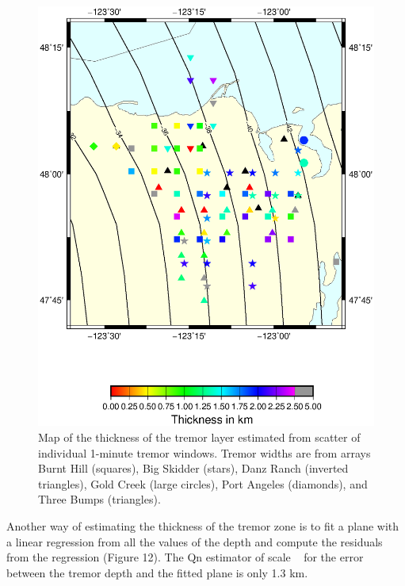 \documentclass[draft]{agujournal2019}
\begin{document}
\begin{figure}
\noindent\includegraphics[width=\textwidth, trim={1cm 5cm 3.5cm 4cm},clip]{figures/Q_PWS_PWS.eps}
\caption{Map of the thickness of the tremor layer estimated from scatter of individual 1-minute tremor windows. Tremor widths are from arrays Burnt Hill (squares), Big Skidder (stars), Danz Ranch (inverted triangles),  Gold Creek (large circles), Port Angeles (diamonds), and Three Bumps (triangles).}
\label{pngfiguresample}
\end{figure}

Another way of estimating the thickness of the tremor zone is to fit a plane with a linear regression from all the values of the depth and compute the residuals from the regression (Figure 12). The Qn estimator of scale ~\cite{ROU_1993} for the error between the tremor depth and the fitted plane is only 1.3 km. \\
\end{document}
